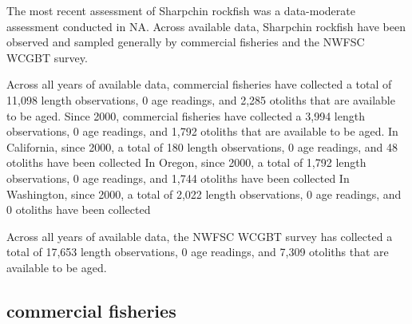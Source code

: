 \documentclass[11pt,
  english,
  letterpaper,
]{article}
\begin{document}
\leavevmode\tagmcend\tagstructend


The most recent assessment of Sharpchin rockfish was a data-moderate assessment conducted in NA. Across available data, Sharpchin rockfish have been observed and sampled generally by commercial fisheries and the NWFSC WCGBT survey.

\leavevmode\tagmcend\tagstructend\par


Across all years of available data, commercial fisheries have collected a total of 11,098 length observations, 0 age readings, and 2,285 otoliths that are available to be aged. Since 2000, commercial fisheries have collected a 3,994 length observations, 0 age readings, and 1,792 otoliths that are available to be aged. In California, since 2000, a total of 180 length observations, 0 age readings, and 48 otoliths have been collected In Oregon, since 2000, a total of 1,792 length observations, 0 age readings, and 1,744 otoliths have been collected In Washington, since 2000, a total of 2,022 length observations, 0 age readings, and 0 otoliths have been collected

\leavevmode\tagmcend\tagstructend\par


Across all years of available data, the NWFSC WCGBT survey has collected a total of 17,653 length observations, 0 age readings, and 7,309 otoliths that are available to be aged.

\leavevmode\tagmcend\tagstructend\par


\hypertarget{commercial-fisheries-46}{%
\subsection{commercial fisheries}\label{commercial-fisheries-46}}

\leavevmode\tagmcend\tagstructend


\begingroup\fontsize{10}{12}\selectfont \begingroup\fontsize{10}{12}\selectfont

\leavevmode\tagmcend\tagstructend\par
\end{document}
